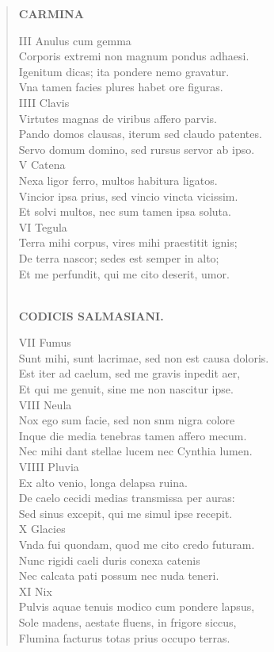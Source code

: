 \documentclass[11pt, a4paper]{report}
\begin{document}
\begin{verse}
    \begin{center} \textbf{CARMINA} \end{center} \marginpar{[004]} III Anulus cum gemma \\ Corporis extremi non magnum pondus adhaesi. \\ Igenitum dicas; ita pondere nemo gravatur. \\ Vna tamen facies plures habet ore figuras. \\ IIII Clavis \\ Virtutes magnas de viribus affero parvis. \\ Pando domos clausas, iterum sed claudo patentes. \\ Servo domum domino, sed rursus servor ab ipso. \\ V Catena \\ Nexa ligor ferro, multos habitura ligatos. \\ Vincior ipsa prius, sed vincio vincta vicissim. \\ Et solvi multos, nec sum tamen ipsa soluta. \\ VI Tegula \\ Terra mihi corpus, vires mihi praestitit ignis; \\ De terra nascor; sedes est semper in alto; \\ Et me perfundit, qui me cito deserit, umor. \\ 
        ﻿\pagebreak 
    \begin{center} \textbf{CODICIS SALMASIANI.} \end{center} \marginpar{[225]} VII Fumus \\ Sunt mihi, sunt lacrimae, sed non est causa doloris. \\ Est iter ad caelum, sed me gravis inpedit aer, \\ Et qui me genuit, sine me non nascitur ipse. \\ VIII Neula \\ Nox ego sum facie, sed non snm nigra colore \\ Inque die media tenebras tamen affero mecum. \\ Nec mihi dant stellae lucem nec Cynthia lumen. \\ VIIII Pluvia \\ Ex alto venio, longa delapsa ruina. \\ De caelo cecidi medias transmissa per auras: \\ Sed sinus excepit, qui me simul ipse recepit. \\ X Glacies \\ Vnda fui quondam, quod me cito credo futuram. \\ Nunc rigidi caeli duris conexa catenis \\ Nec calcata pati possum nec nuda teneri. \\ XI Nix \\ Pulvis aquae tenuis modico cum pondere lapsus, \\ Sole madens, aestate fluens, in frigore siccus, \\ Flumina facturus totas prius occupo terras. \\ 

\end{verse}
\end{document}
